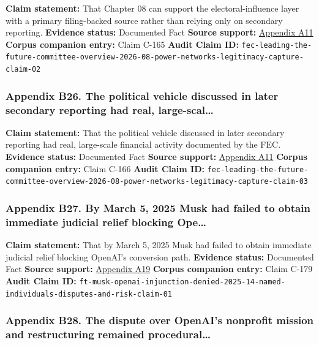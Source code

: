 \documentclass[
  american,
  11pt,
  letterpaper,
]{article}
\begin{document}
\textbf{Claim statement:} That Chapter 08 can support the
electoral-influence layer with a primary filing-backed source rather
than relying only on secondary reporting. \textbf{Evidence status:}
Documented Fact \textbf{Source support:}
\hyperref[appendix-a11-leading-the-future-committee-overview]{Appendix
A11} \textbf{Corpus companion entry:} Claim C-165 \textbf{Audit Claim
ID:}
\texttt{fec-leading-the-future-committee-overview-2026-08-power-networks-legitimacy-capture-claim-02}

\subsubsection{Appendix B26. The political vehicle discussed in later
secondary reporting had real,
large-scal\ldots{}}\label{appendix-b26-the-political-vehicle-discussed-in-later-secondary-reporting-had-real-large-scal}

\textbf{Claim statement:} That the political vehicle discussed in later
secondary reporting had real, large-scale financial activity documented
by the FEC. \textbf{Evidence status:} Documented Fact \textbf{Source
support:}
\hyperref[appendix-a11-leading-the-future-committee-overview]{Appendix
A11} \textbf{Corpus companion entry:} Claim C-166 \textbf{Audit Claim
ID:}
\texttt{fec-leading-the-future-committee-overview-2026-08-power-networks-legitimacy-capture-claim-03}

\subsubsection{Appendix B27. By March 5, 2025 Musk had failed to obtain
immediate judicial relief blocking
Ope\ldots{}}\label{appendix-b27-by-march-5-2025-musk-had-failed-to-obtain-immediate-judicial-relief-blocking-ope}

\textbf{Claim statement:} That by March 5, 2025 Musk had failed to
obtain immediate judicial relief blocking OpenAI's conversion path.
\textbf{Evidence status:} Documented Fact \textbf{Source support:}
\hyperref[appendix-a19-judge-denies-elon-musks-attempt-to-immediately-block-openais-conversion-to-for-profit-entity]{Appendix
A19} \textbf{Corpus companion entry:} Claim C-179 \textbf{Audit Claim
ID:}
\texttt{ft-musk-openai-injunction-denied-2025-14-named-individuals-disputes-and-risk-claim-01}

\subsubsection{Appendix B28. The dispute over OpenAI's nonprofit mission
and restructuring remained
procedural\ldots{}}\label{appendix-b28-the-dispute-over-openai-s-nonprofit-mission-and-restructuring-remained-procedural}
\end{document}

